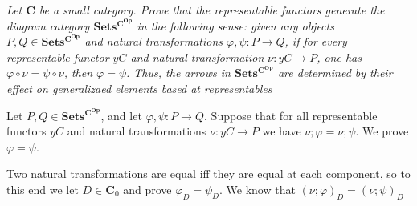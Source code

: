 \documentclass{article}
\newcommand{\mbf}{\mathbf}
\begin{document}
\emph{Let $\mbf{C}$ be a small category. Prove that the representable functors generate the diagram category 
 $\mbf{Sets^{C^{Op}}}$ in the following sense: given any objects $P, Q \in \mbf{Sets^{C^{Op}}}$ and natural transformations
$\varphi, \psi : P \to Q$, if for every representable functor $yC$ and natural transformation $\nu : yC \to P$, 
one has $\varphi \circ \nu = \psi \circ \nu$, then $\varphi = \psi$. Thus, the arrows in $\mbf{Sets^{C^{Op}}}$ are determined by
their effect on generalizaed elements based at representables}

Let $P, Q \in \mbf{Sets^{C^{Op}}}$, and let $\varphi, \psi : P \to Q$. Suppose that for all representable functors
$yC$ and natural transformations $\nu : yC \to P$ we have $\nu;\varphi = \nu;\psi$. We prove $\varphi = \psi$.

Two natural transformations are equal iff they are equal at each component, so to this end we let $D \in \mbf{C}_0$
and prove $\varphi_D = \psi_D$. We know that $(\nu;\varphi)_D = (\nu;\psi)_D$
\end{document}

